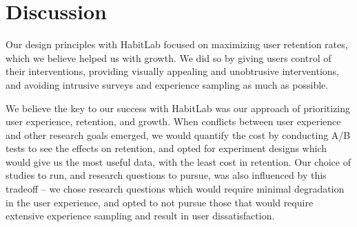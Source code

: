 \chapter{Discussion}



Our design principles with HabitLab focused on maximizing user retention rates, which we believe helped us with growth. We did so by giving users control of their interventions, providing visually appealing and unobtrusive interventions, and avoiding intrusive surveys and experience sampling as much as possible.

We believe the key to our success with HabitLab was our approach of prioritizing user experience, retention, and growth. When conflicts between user experience and other research goals emerged, we would quantify the cost by conducting A/B tests to see the effects on retention, and opted for experiment designs which would give us the most useful data, with the least cost in retention. Our choice of studies to run, and research questions to pursue, was also influenced by this tradeoff -- we chose research questions which would require minimal degradation in the user experience, and opted to not pursue those that would require extensive experience sampling and result in user dissatisfaction.

